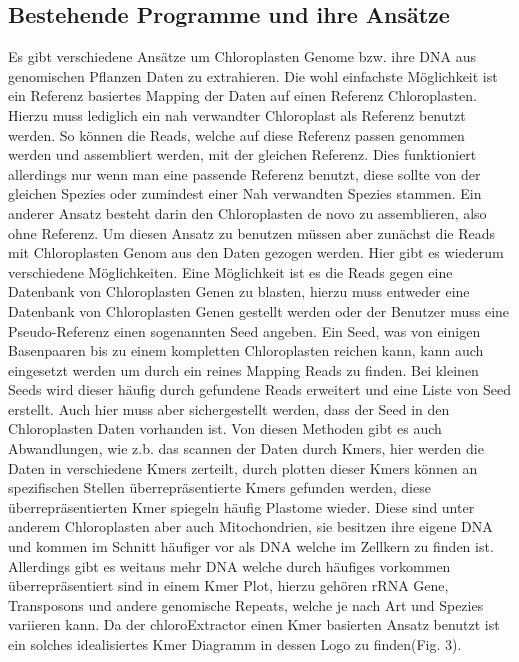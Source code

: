 \documentclass{scrartcl}
\begin{document}
\subsection{Bestehende Programme und ihre Ansätze}
\label{sec-2-5}
Es gibt verschiedene Ansätze um Chloroplasten Genome bzw. ihre DNA aus genomischen Pflanzen Daten zu extrahieren. Die wohl einfachste Möglichkeit ist ein Referenz basiertes
Mapping der Daten auf einen Referenz Chloroplasten. Hierzu muss lediglich ein nah verwandter Chloroplast als Referenz benutzt werden. So können die Reads, welche auf diese Referenz
passen genommen werden und assembliert werden, mit der gleichen Referenz. Dies funktioniert allerdings nur wenn man eine passende Referenz benutzt, diese sollte von der gleichen Spezies oder
zumindest einer Nah verwandten Spezies stammen. Ein anderer Ansatz besteht darin den Chloroplasten de novo zu assemblieren, also ohne Referenz. Um diesen Ansatz zu benutzen müssen
aber zunächst die Reads mit Chloroplasten Genom aus den Daten gezogen werden. Hier gibt es wiederum verschiedene Möglichkeiten. Eine Möglichkeit ist es die Reads gegen eine Datenbank
von Chloroplasten Genen zu blasten, hierzu muss entweder eine Datenbank von Chloroplasten Genen gestellt werden oder der Benutzer muss eine Pseudo-Referenz einen sogenannten Seed angeben.
Ein Seed, was von einigen Basenpaaren bis zu einem kompletten Chloroplasten reichen kann, kann auch eingesetzt werden um durch ein reines Mapping Reads zu finden. Bei kleinen Seeds wird dieser
häufig durch gefundene Reads erweitert und eine Liste von Seed erstellt. Auch hier muss aber sichergestellt werden, dass der Seed in den Chloroplasten Daten vorhanden ist.
Von diesen Methoden gibt es auch Abwandlungen, wie z.b. das scannen der Daten durch Kmers, hier werden die Daten in verschiedene Kmers zerteilt, durch plotten dieser Kmers können
an spezifischen Stellen überrepräsentierte Kmers gefunden werden, diese überrepräsentierten Kmer spiegeln häufig Plastome wieder. Diese sind unter anderem Chloroplasten aber auch
Mitochondrien, sie besitzen ihre eigene DNA und kommen im Schnitt häufiger vor als DNA welche im Zellkern zu finden ist. Allerdings gibt es weitaus mehr DNA welche durch häufiges vorkommen
überrepräsentiert sind in einem Kmer Plot, hierzu gehören rRNA Gene, Transposons und andere genomische Repeats, welche je nach Art und Spezies variieren kann. 
Da der chloroExtractor einen Kmer basierten Ansatz benutzt ist ein solches idealisiertes Kmer Diagramm in dessen Logo zu finden(Fig. 3).
\end{document}

